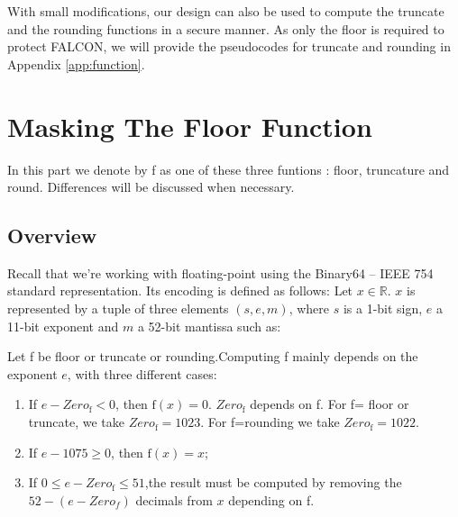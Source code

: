 \documentclass[runningheads]{llncs}
\begin{document}
\begin{remark}
  With small modifications, our design can also be used to compute the truncate and the rounding functions in a secure manner. As only the floor is required to protect FALCON, we will provide the pseudocodes for truncate and rounding in Appendix \ref{app:function}.
\end{remark}

\section{Masking The Floor Function}\label{sec:maskfloor}
In this part we denote by f as one of these three funtions : floor, truncature and round. Differences will be discussed when necessary.

\subsection{Overview}
  Recall that we're working with floating-point using the Binary64 -- IEEE 754 \cite{kahan1996ieee} standard representation. Its encoding is defined as follows:
    Let $x \in \mathbb{R}$. $x$ is represented by a tuple of three elements $(s,e,m)$, where $s$ is a 1-bit sign, $e$ a 11-bit exponent and $m$ a 52-bit mantissa such as:%
    \begin{lemma}
      \label{lemma:function}
      Let f be floor or truncate or rounding.Computing f mainly depends on the exponent $e$, with three different cases:
    \begin{enumerate}
        \item If $e-Zero_\text{f}<0$, then $\text{f}(x)=0$. $Zero_\text{f}$ depends on f. For f= floor or truncate, we take $Zero_\text{f}=1023$. For f=rounding we take $Zero_\text{f}=1022$.
        \item If $e-1075\geq0$, then $\text{f}(x)=x$;
        \item If $0\leq e-Zero_\text{f} \leq 51$,the result must be computed by removing the $52-(e-Zero_{f})$ decimals from $x$ depending on f. 
    \end{enumerate}
    \end{lemma}
\end{document}
